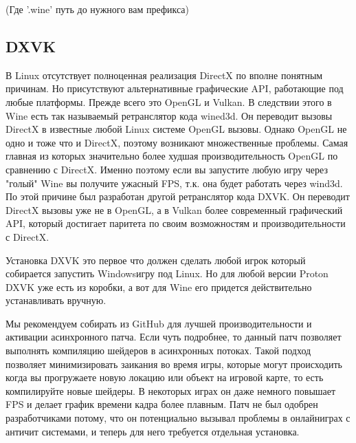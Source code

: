 \documentclass[letterpaper,10pt,russian,openany]{sphinxmanual}
\begin{document}
\sphinxAtStartPar
(Где '.wine' \sphinxhyphen{} путь до нужного вам префикса)

\ignorespaces 

\subsection{DXVK}
\label{\detokenize{source/linux-gaming:dxvk}}\label{\detokenize{source/linux-gaming:index-9}}\label{\detokenize{source/linux-gaming:id9}}
\sphinxAtStartPar
В Linux отсутствует полноценная реализация DirectX по вполне понятным причинам. Но присутствуют альтернативные графические API, работающие под любые платформы.
Прежде всего это OpenGL и Vulkan. В следствии этого в Wine есть так называемый ретранслятор кода \sphinxhyphen{} wined3d.
Он переводит вызовы DirectX в известные любой Linux системе OpenGL вызовы. Однако OpenGL не одно и тоже что и DirectX,
поэтому возникают множественные проблемы. Самая главная из которых \sphinxhyphen{} значительно более худшая производительность OpenGL
по сравнению с DirectX. Именно поэтому если вы запустите любую игру через "голый" Wine вы получите ужасный FPS, т.к. она будет работать через wind3d.
По этой причине был разработан другой ретранслятор кода \sphinxhyphen{} DXVK. Он переводит DirectX вызовы уже не в
OpenGL, а в Vulkan \sphinxhyphen{} более современный графический API, который достигает паритета по своим возможностям и производительности с DirectX.

\sphinxAtStartPar
Установка DXVK \sphinxhyphen{} это первое что должен сделать любой игрок который собирается запустить Windows\sphinxhyphen{}игру под Linux.
Но для любой версии Proton DXVK уже есть из коробки, а вот для Wine его придется действительно устанавливать вручную.

\sphinxAtStartPar
Мы рекомендуем собирать 
из GitHub для лучшей производительности и активации асинхронного патча. Если чуть подробнее,
то данный патч позволяет выполнять компиляцию шейдеров в асинхронных потоках.
Такой подход позволяет минимизировать заикания во время игры, которые могут происходить когда вы прогружаете новую локацию или объект на игровой карте,
то есть компилируйте новые шейдеры. В некоторых играх он даже немного повышает FPS и делает график времени кадра более плавным.
Патч не был одобрен разработчиками потому, что он потенциально вызывал проблемы в онлайн\sphinxhyphen{}играх с анти\sphinxhyphen{}чит системами, и теперь
для него требуется отдельная установка.
\end{document}
